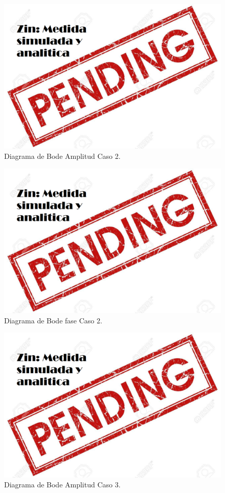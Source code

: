 \begin{figure}[H]	
	\centering
	\includegraphics[width=\textwidth]{Ejercicio1/Imagenes/BodeC2.png}
	\caption{Diagrama de Bode Amplitud Caso 2.}
	\label{fig:BodeC2}
\end{figure} 
\begin{figure}[H]	
	\centering
	\includegraphics[width=\textwidth]{Ejercicio1/Imagenes/BodephC2.png}
	\caption{Diagrama de Bode fase Caso 2.}
	\label{fig:BodephC2}
\end{figure} 
\begin{figure}[H]	
	\centering
	\includegraphics[width=\textwidth]{Ejercicio1/Imagenes/BodeC3.png}
	\caption{Diagrama de Bode Amplitud Caso 3.}
	\label{fig:BodeC3}
\end{figure} 
